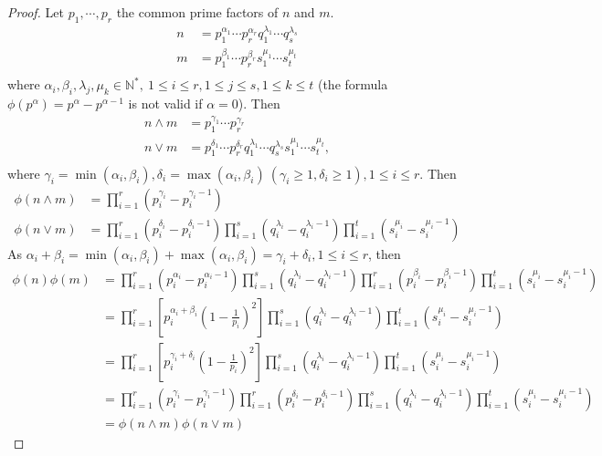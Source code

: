\documentclass[11pt,a4paper]{article}
\newcommand{\N}{\mathbb{N}}
\begin{document}
{\begin{proof}
Let $p_1,\cdots,p_r$ the common prime factors of $n$ and $m$.
\begin{align*}
n &= p_1^{\alpha_1}\cdots p_r^{\alpha_r} q_1^{\lambda_1}\cdots q_s^{\lambda_s}\\
m&= p_1^{\beta_1}\cdots p_r^{\beta_r} s_1^{\mu_1}\cdots s_t^{\mu_t}\\
\end{align*}
where $\alpha_i, \beta_i, \lambda_j,\mu_k \in \N^*, \ 1\leq i \leq r, 1\leq j \leq s, 1\leq k \leq t$ (the formula $\phi(p^\alpha) = p^\alpha - p^{\alpha - 1}$ is not valid if $\alpha = 0$).
Then 
\begin{align*}
n\wedge m &= p_1^{\gamma_1}\cdots p_r^{\gamma_r}\\
n \vee m &= p_1^{\delta_1}\cdots p_r^{\delta_r} q_1^{\lambda_1}\cdots q_s^{\lambda_s}s_1^{\mu_1}\cdots s_t^{\mu_t},\\
\end{align*}
where $\gamma_i = \min(\alpha_i,\beta_i) , \delta_i = \max(\alpha_i,\beta_i)\ (\gamma_i \geq 1, \delta_i \geq 1), 1\leq i \leq r$.
Then
\begin{align*}
\phi(n\wedge m) &=  \prod_{i=1}^r (p_i^{\gamma_i} - p_i^{\gamma_i - 1})\\
\phi(n\vee m)      &=  \prod_{i=1}^r(p_i^{\delta_i} - p_i^{\delta_i - 1}) \prod_{i=1}^s (q_i^{\lambda_i} - q_i^{\lambda_i - 1}) \prod_{i=1}^t (s_i^{\mu_i} - s_i^{\mu_i - 1})
\end{align*}
As $\alpha_i + \beta_i = \min(\alpha_i,\beta_i) +  \max(\alpha_i,\beta_i) = \gamma_i + \delta_i, 1\leq i \leq r$, then
\begin{align*}
\phi(n)\phi(m) &= \prod_{i=1}^r(p_i^{\alpha_i} - p_i^{\alpha_i - 1}) \prod_{i=1}^s(q_i^{\lambda_i} - q_i^{\lambda_i - 1}) \prod_{i=1}^r(p_i^{\beta_i} - p_i^{\beta_i - 1}) \prod_{i=1}^t(s_i^{\mu_i} - s_i^{\mu_i - 1})\\
&=\prod_{i=1}^r \left [ p_i^{\alpha_i + \beta_i} \left( 1- \frac{1}{p_i}\right)^2 \right]  \prod_{i=1}^s(q_i^{\lambda_i} - q_i^{\lambda_i - 1})  \prod_{i=1}^t(s_i^{\mu_i}- s_i^{\mu_i - 1})\\
&=\prod_{i=1}^r \left [ p_i^{\gamma_i+\delta_i} \left( 1- \frac{1}{p_i}\right)^2 \right]  \prod_{i=1}^s(q_i^{\lambda_i} - q_i^{\lambda_i - 1})  \prod_{i=1}^t(s_i^{\mu_i}- s_i^{\mu_i - 1})\\
&=\prod_{i=1}^r (p_i^{\gamma_i} - p_i^{\gamma_i - 1}) \prod_{i=1}^r(p_i^{\delta_i} - p_i^{\delta_i - 1})  \prod_{i=1}^s(q_i^{\lambda_i} - q_i^{\lambda_i - 1})  \prod_{i=1}^t(s_i^{\mu_i}- s_i^{\mu_i - 1})\\
&= \phi(n\wedge m) \phi(n\vee m)
\end{align*}
\end{proof}

}
\end{document}
